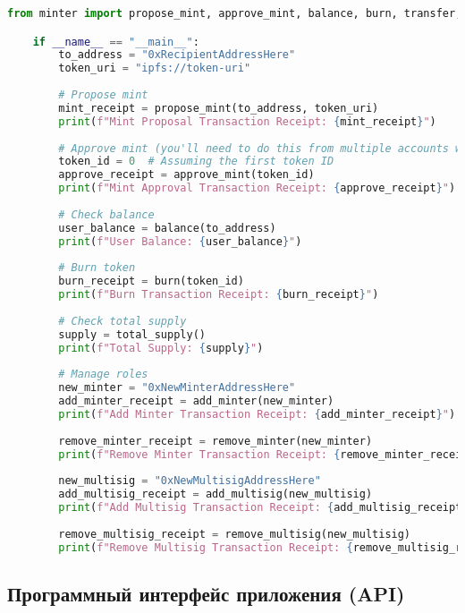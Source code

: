 \begin{lstlisting}[language=Python, caption=Интерфейс для консольного запуска (\_\_main\_\_.py)]
    from minter import propose_mint, approve_mint, balance, burn, transfer, total_supply, add_minter, remove_minter, add_multisig, remove_multisig

    if __name__ == "__main__":
        to_address = "0xRecipientAddressHere"
        token_uri = "ipfs://token-uri"
    
        # Propose mint
        mint_receipt = propose_mint(to_address, token_uri)
        print(f"Mint Proposal Transaction Receipt: {mint_receipt}")
    
        # Approve mint (you'll need to do this from multiple accounts with MULTISIG_ROLE)
        token_id = 0  # Assuming the first token ID
        approve_receipt = approve_mint(token_id)
        print(f"Mint Approval Transaction Receipt: {approve_receipt}")
    
        # Check balance
        user_balance = balance(to_address)
        print(f"User Balance: {user_balance}")
    
        # Burn token
        burn_receipt = burn(token_id)
        print(f"Burn Transaction Receipt: {burn_receipt}")
    
        # Check total supply
        supply = total_supply()
        print(f"Total Supply: {supply}")
    
        # Manage roles
        new_minter = "0xNewMinterAddressHere"
        add_minter_receipt = add_minter(new_minter)
        print(f"Add Minter Transaction Receipt: {add_minter_receipt}")
    
        remove_minter_receipt = remove_minter(new_minter)
        print(f"Remove Minter Transaction Receipt: {remove_minter_receipt}")
    
        new_multisig = "0xNewMultisigAddressHere"
        add_multisig_receipt = add_multisig(new_multisig)
        print(f"Add Multisig Transaction Receipt: {add_multisig_receipt}")
    
        remove_multisig_receipt = remove_multisig(new_multisig)
        print(f"Remove Multisig Transaction Receipt: {remove_multisig_receipt}")    
\end{lstlisting}

\subsection{Программный интерфейс приложения (API)}

